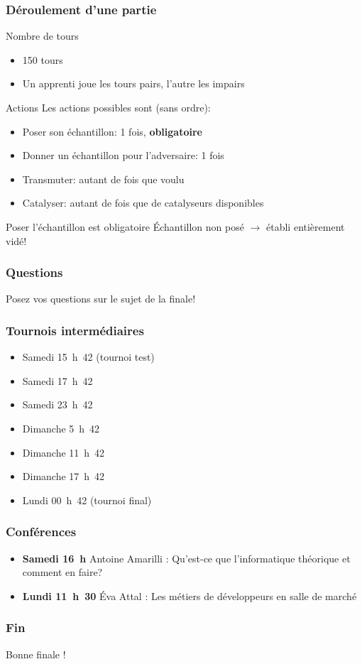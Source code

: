 \documentclass{beamer}
\begin{document}
\begin{frame}
    \frametitle{Déroulement d’une partie}
    \begin{block}{Nombre de tours}
        \begin{itemize}
            \item 150 tours
            \item Un apprenti joue les tours pairs, l'autre les impairs
        \end{itemize}
    \end{block}
    \begin{block}{Actions}
        Les actions possibles sont (sans ordre):
        \begin{itemize}
            \item Poser son échantillon: 1 fois, \textbf{obligatoire}
            \item Donner un échantillon pour l'adversaire: 1 fois
            \item Transmuter: autant de fois que voulu
            \item Catalyser: autant de fois que de catalyseurs disponibles
        \end{itemize}
    \end{block}
    \begin{alertblock}{Poser l'échantillon est obligatoire}
        Échantillon non posé $\rightarrow$ établi entièrement vidé!
    \end{alertblock}
\end{frame}

\begin{frame}
    \frametitle{Questions}
    Posez vos questions sur le sujet de la finale!
\end{frame}

\begin{frame}
    \frametitle{Tournois intermédiaires}
    \begin{itemize}
        \item Samedi 15~h~42 (tournoi test)
        \item Samedi 17~h~42
        \item Samedi 23~h~42
        \item Dimanche 5~h~42
        \item Dimanche 11~h~42
        \item Dimanche 17~h~42
        \item Lundi 00~h~42 (tournoi final)
    \end{itemize}
\end{frame}

\begin{frame}
    \frametitle{Conférences}
    \begin{itemize}
        \item \textbf{Samedi 16~h} Antoine Amarilli : Qu'est-ce que
            l'informatique théorique et comment en faire?
        \item \textbf{Lundi 11~h~30} Éva Attal : Les métiers de développeurs en
            salle de marché
    \end{itemize}
\end{frame}

\begin{frame}
    \frametitle{Fin}
    Bonne finale !
\end{frame}
\end{document}
